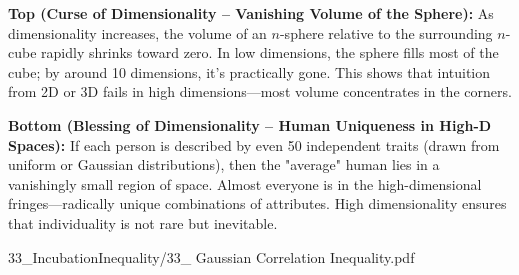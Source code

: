\begin{SideNotePage}{
  \textbf{Top (Curse of Dimensionality – Vanishing Volume of the Sphere):}  
  As dimensionality increases, the volume of an $n$-sphere relative to the surrounding $n$-cube rapidly shrinks toward zero. In low dimensions, the sphere fills most of the cube; by around 10 dimensions, it's practically gone. This shows that intuition from 2D or 3D fails in high dimensions—most volume concentrates in the corners. \par

  \textbf{Bottom (Blessing of Dimensionality – Human Uniqueness in High-D Spaces):}  
  If each person is described by even 50 independent traits (drawn from uniform or Gaussian distributions), then the "average" human lies in a vanishingly small region of space. Almost everyone is in the high-dimensional fringes—radically unique combinations of attributes. High dimensionality ensures that individuality is not rare but inevitable. \par
}{33_IncubationInequality/33_ Gaussian Correlation Inequality.pdf}
\end{SideNotePage}
